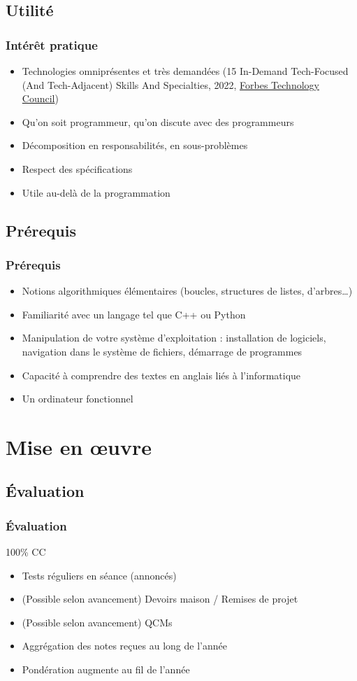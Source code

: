 \documentclass[english, french]{beamer}
\begin{document}
\subsection{Utilité}
\begin{frame}
	\frametitle{Intérêt pratique}
	\begin{itemize}
		\item Technologies omniprésentes et très demandées {\tiny (15 In-Demand Tech-Focused (And Tech-Adjacent) Skills And Specialties, 2022, \href{https://www.forbes.com/sites/forbestechcouncil/2022/07/11/15-in-demand-tech-focused-and-tech-adjacent-skills-and-specialties/?sh=44e82adc38d8}{Forbes Technology Council})}
		\item Qu’on soit programmeur, qu’on discute avec des programmeurs
		\item Décomposition en responsabilités, en sous-problèmes
		\item Respect des spécifications
		\item Utile au-delà de la programmation
	\end{itemize}
\end{frame}

\subsection{Prérequis}
\begin{frame}
	\frametitle{Prérequis}
	\begin{itemize}
		\item Notions algorithmiques élémentaires (boucles, structures de listes, d’arbres…)
		\item Familiarité avec un langage tel que C++ ou Python
		\item Manipulation de votre système d’exploitation : installation de logiciels, navigation dans le système de fichiers, démarrage de programmes
		\item Capacité à comprendre des textes en anglais liés à l’informatique
		\item Un ordinateur fonctionnel
	\end{itemize}
\end{frame}

\section{Mise en œuvre}
\subsection{Évaluation}
\begin{frame}
	\frametitle{Évaluation}
	100\% CC
	\begin{itemize}
		\item Tests réguliers en séance (annoncés)
		\item (Possible selon avancement) Devoirs maison / Remises de projet
		\item (Possible selon avancement)  QCMs
		\item Aggrégation des notes reçues au long de l’année
		\item Pondération augmente au fil de l’année
	\end{itemize}
\end{frame}
\end{document}
